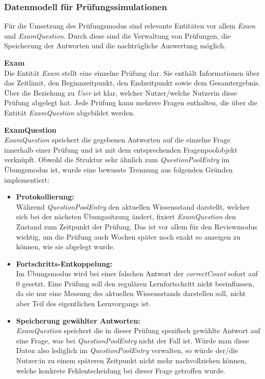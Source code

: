 \subsubsection{Datenmodell für Prüfungssimulationen}
Für die Umsetzung des Prüfungsmodus sind relevante Entitäten vor allem \textit{Exam} und \textit{ExamQuestion}. Durch diese sind die
Verwaltung von Prüfungen, die Speicherung der Antworten und die nachträgliche Auswertung möglich.

\vspace{0.2cm}
\textbf{Exam} \\
Die Entität \textit{Exam} stellt eine einzelne Prüfung dar. Sie enthält Informationen über das Zeitlimit, den Beginnzeitpunkt, den 
Endzeitpunkt sowie dem Gesamtergebnis. Über die Beziehung zu \textit{User} ist klar, welcher Nutzer/welche Nutzerin diese Prüfung
abgelegt hat. Jede Prüfung kann mehrere Fragen enthalten, die über die Entität \textit{ExamQuestion} abgebildet werden.

\vspace{0.2cm}
\textbf{ExamQuestion} \\
\textit{ExamQuestion} speichert die gegebenen Antworten auf die einzelne Frage innerhalb einer Prüfung und ist mit dem entsprechenden
Fragenpoolobjekt verknüpft. Obwohl die Struktur sehr ähnlich zum \textit{QuestionPoolEntry} im Übungsmodus ist, wurde eine bewusste Trennung aus folgenden Gründen implementiert:

\begin{itemize}
	\item \textbf{Protokollierung:} \\
	Während \textit{QuestionPoolEntry} den aktuellen Wissensstand darstellt, welcher sich bei der nächsten Übungssitzung ändert, fixiert \textit{ExamQuestion} den Zustand zum Zeitpunkt der Prüfung. Das ist vor allem für den Reviewmodus wichtig, um die Prüfung auch Wochen später noch exakt so anzeigen zu können, wie sie abgelegt wurde.
	
	\item \textbf{Fortschritts-Entkoppelung:} \\
	Im Übungsmodus wird bei einer falschen Antwort der \textit{correctCount} sofort auf 0 gesetzt. Eine Prüfung soll den regulären Lernfortschritt nicht beeinflussen, da sie nur eine Messung des aktuellen Wissensstands darstellen soll, nicht aber Teil des eigentlichen Lernvorgangs ist.
	
	\item \textbf{Speicherung gewählter Antworten:} \\
	\textit{ExamQuestion} speichert die in dieser Prüfung spezifisch gewählte Antwort auf eine Frage, was bei \textit{QuestionPoolEntry} nicht der Fall ist. Würde man diese Daten also lediglich im \textit{QuestionPoolEntry} verwalten, so würde der/die Nutzer:in zu einem späteren Zeitpunkt nicht mehr nachvollziehen können, welche konkrete Fehlentscheidung bei dieser Frage getroffen wurde.
\end{itemize}



